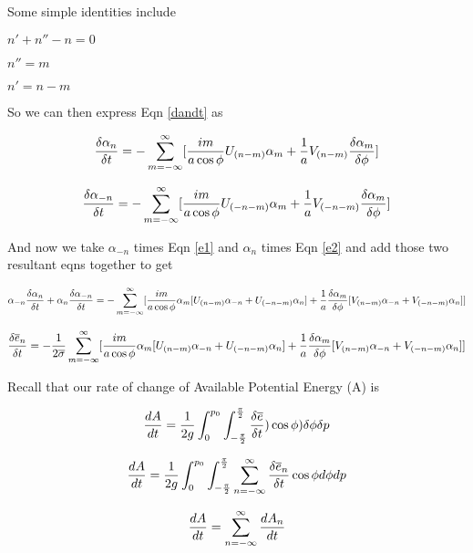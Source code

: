 \documentclass{article}
\begin{document}
Some simple identities include

$n' + n'' -n = 0$

$n'' = m$

$n' = n - m$

So we can then express Eqn \ref{dandt} as

\begin{equation}
\frac{\delta \alpha_n}{\delta t} = - \sum_{m=-\infty}^{\infty} [ \frac{im}{a \cos{\phi}} U_{(n-m)} \alpha_m + \frac{1}{a} V_{(n-m)} \frac{\delta \alpha_m}{\delta \phi} ]
\label{e1}
\end{equation}

\begin{equation}
\frac{\delta \alpha_{-n}}{\delta t} = - \sum_{m=-\infty}^{\infty} [ \frac{im}{a \cos{\phi}} U_{(-n-m)} \alpha_m + \frac{1}{a} V_{(-n-m)} \frac{\delta \alpha_m}{\delta \phi} ]
\label{e2}
\end{equation}

And now we take $\alpha_{-n}$ times Eqn \ref{e1} and $\alpha_n$ times Eqn \ref{e2} and add those two resultant eqns together to get

\begin{equation}
\alpha_{-n} \frac{\delta \alpha_{n}}{\delta t} + \alpha_{n} \frac{\delta \alpha_{-n}}{\delta t} = - \sum_{m=-\infty}^{\infty} [ \frac{im}{a \cos{\phi}} \alpha_m [ U_{(n-m)} \alpha_{-n} + U_{(-n-m)} \alpha_n ] + \frac{1}{a} \frac{\delta \alpha_m}{\delta \phi} [ V_{(n-m)} \alpha_{-n} + V_{(-n-m)} \alpha_n ] ]
\end{equation}

\begin{equation}
\frac{\delta \overline{e}_n}{\delta t} = - \frac{1}{2\overline{\sigma}} \sum_{m=-\infty}^{\infty} [ \frac{im}{a \cos{\phi}} \alpha_m [ U_{(n-m)} \alpha_{-n} + U_{(-n-m)} \alpha_{n} ] + \frac{1}{a} \frac{\delta \alpha_m}{\delta \phi} [ V_{(n-m)} \alpha_{-n} + V_{(-n-m)} \alpha_n ] ]
\end{equation}

Recall that our rate of change of Available Potential Energy (A) is

\begin{equation}
\frac{dA}{dt} = \frac{1}{2g} \int_{0}^{p_0} \int_{-\frac{\pi}{2}}^{\frac{\pi}{2}} \frac{\delta \overline{e}}{\delta t} )\cos{\phi}) \delta \phi \delta p
\end{equation}

\begin{equation}
\frac{dA}{dt} = \frac{1}{2g} \int_{0}^{p_0} \int_{-\frac{\pi}{2}}^{\frac{\pi}{2}} \sum_{n=-\infty}^{\infty} \frac{\delta \overline{e}_n}{\delta t} \cos{\phi} d\phi dp
\end{equation}

\begin{equation}
\frac{dA}{dt} = \sum_{n=-\infty}^{\infty} \frac{d A_n}{d t}
\end{equation}
\end{document}
